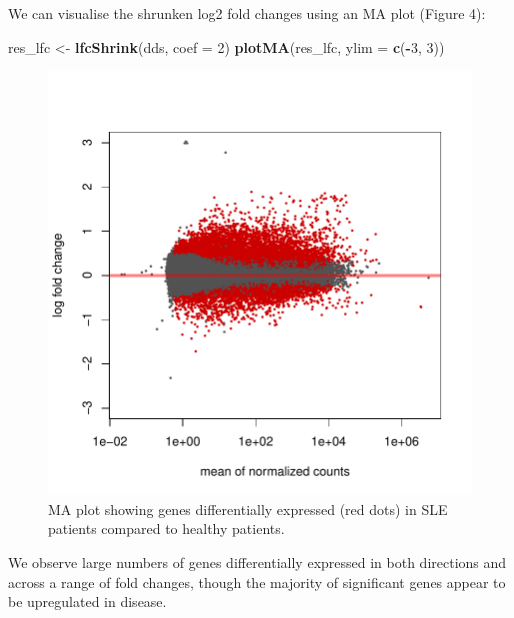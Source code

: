 \documentclass[9pt,a4paper,]{extarticle}
\newenvironment{Shaded}{\begin{snugshade}}{\end{snugshade}}
\newcommand{\KeywordTok}[1]{\textcolor[rgb]{0.13,0.29,0.53}{\textbf{#1}}}
\newcommand{\DataTypeTok}[1]{\textcolor[rgb]{0.13,0.29,0.53}{#1}}
\newcommand{\DecValTok}[1]{\textcolor[rgb]{0.00,0.00,0.81}{#1}}
\newcommand{\StringTok}[1]{\textcolor[rgb]{0.31,0.60,0.02}{#1}}
\newcommand{\OperatorTok}[1]{\textcolor[rgb]{0.81,0.36,0.00}{\textbf{#1}}}
\newcommand{\NormalTok}[1]{#1}
\theoremstyle{definition}
\theoremstyle{definition}
\theoremstyle{definition}
\theoremstyle{remark}
\begin{document}
We can visualise the shrunken log2 fold changes using an MA plot (Figure 4):

\begin{Shaded}
\begin{Highlighting}[]
\NormalTok{res_lfc <-}\StringTok{ }\KeywordTok{lfcShrink}\NormalTok{(dds, }\DataTypeTok{coef =} \DecValTok{2}\NormalTok{)}
\KeywordTok{plotMA}\NormalTok{(res_lfc, }\DataTypeTok{ylim =} \KeywordTok{c}\NormalTok{(}\OperatorTok{-}\DecValTok{3}\NormalTok{, }\DecValTok{3}\NormalTok{))}
\end{Highlighting}
\end{Shaded}

\begin{figure}

{\centering \includegraphics{biocondutor-regulatory-genomics-workflow_files/figure-latex/figure4-1} 

}

\caption{MA plot showing genes differentially expressed (red dots) in SLE patients compared to healthy patients.}\label{fig:figure4}
\end{figure}

We observe large numbers of genes differentially expressed in both directions and across a range of fold changes, though the majority of significant genes appear to be upregulated in disease.
\end{document}
